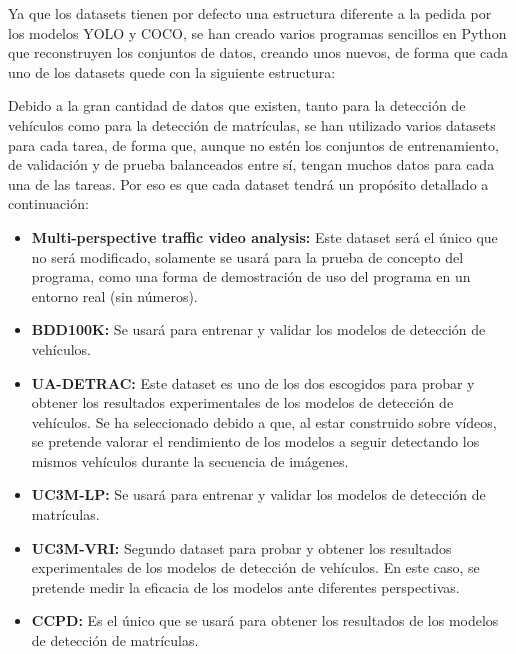 \documentclass[12pt,a4paper,onecolumn,oneside]{report}
\begin{document}
Ya que los datasets tienen por defecto una estructura diferente a la pedida por los modelos YOLO y COCO, se han creado varios programas sencillos en Python que reconstruyen los conjuntos de datos, creando unos nuevos, de forma que cada uno de los datasets quede con la siguiente estructura:


Debido a la gran cantidad de datos que existen, tanto para la detección de vehículos como para la detección de matrículas, se han utilizado varios datasets para cada tarea, de forma que, aunque no estén los conjuntos de entrenamiento, de validación y de prueba balanceados entre sí, tengan muchos datos para cada una de las tareas. Por eso es que cada dataset tendrá un propósito detallado a continuación:
\begin{itemize}
    \item \textbf{Multi-perspective traffic video analysis:} Este dataset será el único que no será modificado, solamente se usará para la prueba de concepto del programa, como una forma de demostración de uso del programa en un entorno real (sin números).
    
    \item \textbf{BDD100K:} Se usará para entrenar y validar los modelos de detección de vehículos.
    
    \item \textbf{UA-DETRAC:} Este dataset es uno de los dos escogidos para probar y obtener los resultados experimentales de los modelos de detección de vehículos. Se ha seleccionado debido a que, al estar construido sobre vídeos, se pretende valorar el rendimiento de los modelos a seguir detectando los mismos vehículos durante la secuencia de imágenes.
    
    \item \textbf{UC3M-LP:} Se usará para entrenar y validar los modelos de detección de matrículas.
    
    \item \textbf{UC3M-VRI:} Segundo dataset para probar y obtener los resultados experimentales de los modelos de detección de vehículos. En este caso, se pretende medir la eficacia de los modelos ante diferentes perspectivas.
    
    \item \textbf{CCPD:} Es el único que se usará para obtener los resultados de los modelos de detección de matrículas.
\end{itemize}
\end{document}
